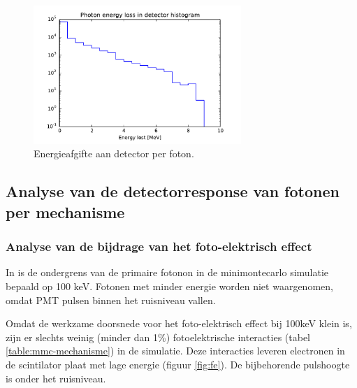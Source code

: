 \documentclass[a4paper,11pt]{article}
\begin{document}
\begin{figure}[t]
  \begin{center}
    \includegraphics[width=0.7\textwidth]{fig-Eloss-hist.pdf}
    \caption{\label{fig:Eloss-hist} Energieafgifte aan detector per foton.}
  \end{center}
\end{figure}


\subsection{Analyse van de detectorresponse van fotonen per mechanisme}

\subsubsection{Analyse van de bijdrage van het foto-elektrisch effect}
In \cite*{Steijger2010-gammas} is de ondergrens van de primaire fotonon in de minimontecarlo simulatie bepaald op 100 keV. Fotonen met minder energie worden niet waargenomen, omdat PMT pulsen binnen het ruisniveau vallen.

Omdat de werkzame doorsnede voor het foto-elektrisch effect bij 100keV klein is, zijn er slechts weinig (minder dan 1\%) fotoelektrische interacties (tabel  \ref{table:mmc-mechanisme}) in de simulatie. Deze interacties leveren electronen in de scintilator plaat met lage energie (figuur \ref{fig:fe}). De bijbehorende pulshoogte is onder het ruisniveau.
\end{document}
